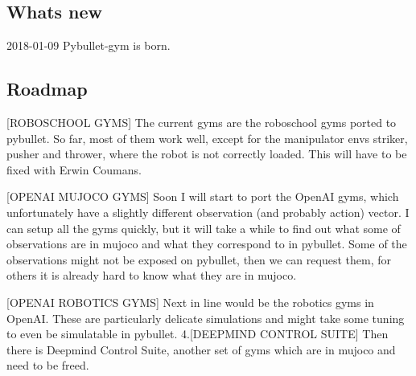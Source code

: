 \subsection*{What\textquotesingle{}s new}


\begin{DoxyItemize}
\item 2018-\/01-\/09 Pybullet-\/gym is born.
\end{DoxyItemize}

\subsection*{Roadmap}


\begin{DoxyEnumerate}
\item \mbox{[}R\+O\+B\+O\+S\+C\+H\+O\+OL G\+Y\+MS\mbox{]} The current gyms are the roboschool gyms ported to pybullet. So far, most of them work well, except for the manipulator envs striker, pusher and thrower, where the robot is not correctly loaded. This will have to be fixed with Erwin Coumans. 
\item \mbox{[}O\+P\+E\+N\+AI M\+U\+J\+O\+CO G\+Y\+MS\mbox{]} Soon I will start to port the Open\+AI gyms, which unfortunately have a slightly different observation (and probably action) vector. I can setup all the gyms quickly, but it will take a while to find out what some of observations are in mujoco and what they correspond to in pybullet. Some of the observations might not be exposed on pybullet, then we can request them, for others it is already hard to know what they are in mujoco. 
\item \mbox{[}O\+P\+E\+N\+AI R\+O\+B\+O\+T\+I\+CS G\+Y\+MS\mbox{]} Next in line would be the robotics gyms in Open\+AI. These are particularly delicate simulations and might take some tuning to even be simulatable in pybullet. 4.\mbox{[}D\+E\+E\+P\+M\+I\+ND C\+O\+N\+T\+R\+OL S\+U\+I\+TE\mbox{]} Then there is Deepmind Control Suite, another set of gyms which are in mujoco and need to be freed.  
\end{DoxyEnumerate}